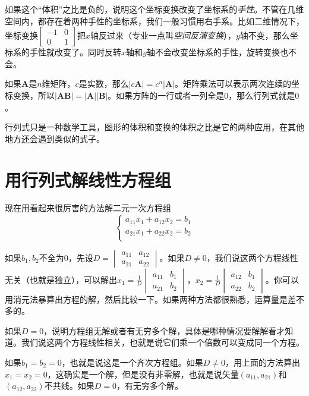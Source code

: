 如果这个“体积”之比是负的，说明这个坐标变换改变了坐标系的\emph{手性}。不管在几维空间内，都存在着两种手性的坐标系，我们一般习惯用右手系。比如二维情况下，坐标变换$\begin{bmatrix}
-1 & 0 \\
0 & 1
\end{bmatrix}$把$x$轴反过来（专业一点叫\emph{空间反演变换}），$y$轴不变，那么坐标系的手性就改变了。同时反转$x$轴和$y$轴不会改变坐标系的手性，旋转变换也不会。

如果$\mathbf{A}$是$n$维矩阵，$c$是实数，那么$|c \mathbf{A}|=c^n |\mathbf{A}|$。矩阵乘法可以表示两次连续的坐标变换，所以$|\mathbf{A} \mathbf{B}|=|\mathbf{A}| |\mathbf{B}|$。如果方阵的一行或者一列全是$0$，那么行列式就是$0$。

行列式只是一种数学工具，图形的体积和变换的体积之比是它的两种应用，在其他地方还会遇到类似的式子。
\section{用行列式解线性方程组}
现在用看起来很厉害的方法解二元一次方程组
\begin{equation*}
\begin{cases}
a_{1 1} x_1+a_{1 2} x_2=b_1 \\
a_{2 1} x_1+a_{2 2} x_2=b_2 \\
\end{cases}
\end{equation*}

如果$b_1, b_2$不全为$0$，先设$D=\begin{vmatrix}
a_{1 1} & a_{1 2} \\
a_{2 1} & a_{2 2}
\end{vmatrix}$。如果$D \neq 0$，我们说这两个方程线性无关（也就是独立），可以解出$x_1=\frac{1}{D}\begin{vmatrix}
a_{1 1} & b_1 \\
a_{2 1} & b_2
\end{vmatrix}$，$x_2=\frac{1}{D}\begin{vmatrix}
a_{1 2} & b_1 \\
a_{2 2} & b_2
\end{vmatrix}$。你可以用消元法暴算出方程的解，然后比较一下。如果两种方法都很熟悉，运算量是差不多的。

如果$D=0$，说明方程组无解或者有无穷多个解，具体是哪种情况要解解看才知道。我们说这两个方程线性相关，也就是说它们乘一个倍数可以变成同一个方程。

如果$b_1=b_2=0$，也就是说这是一个齐次方程组。如果$D \neq 0$，用上面的方法算出$x_1=x_2=0$，这确实是一个解，但是没有非零解，也就是说矢量$(a_{1 1}, a_{2 1})$和$(a_{1 2}, a_{2 2})$不共线。如果$D=0$，有无穷多个解。

